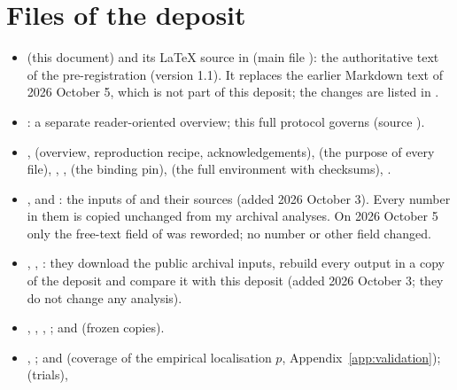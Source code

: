 \section{Files of the deposit} \label{app:files}

\begin{itemize}
\item {} (this document) and its LaTeX source in  (main
  file ): the authoritative text of the pre-registration (version 1.1). It replaces the
  earlier Markdown text  of 2026 October 5, which is not part of this deposit; the
  changes are listed in .
\item {}: a separate reader-oriented overview; this full protocol governs (source ).
\item {},  (overview, reproduction recipe, acknowledgements),  (the
  purpose of every file), , ,  (the binding pin),
   (the full environment with checksums), .
\item {},  and : the
  inputs of  and their sources (added 2026 October 3). Every number in them is copied
  unchanged from my archival analyses. On 2026 October 5 only the free-text field  of
   was reworded; no number or other field changed.
\item {}, , : they download
  the public archival inputs, rebuild every output in a copy of the deposit and compare it with this deposit (added
  2026 October 3; they do not change any analysis).
\item {}, , , ;
   and  (frozen copies).
\item {}, ;
   and  (coverage of the empirical
  localisation $p$, Appendix~\ref{app:validation});  (trials),

\end{itemize}
